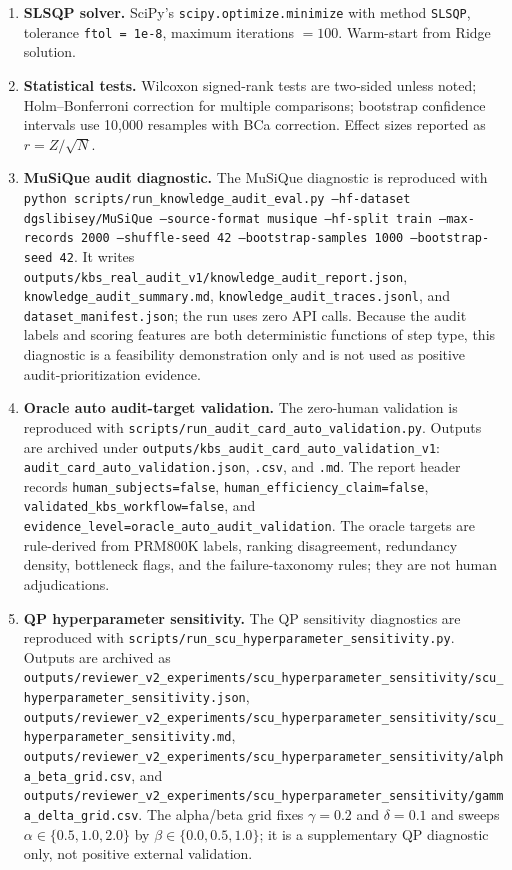 \documentclass[a4paper,fleqn]{cas-sc}
\begin{document}
\begin{enumerate}
\item \textbf{SLSQP solver.} SciPy's \texttt{scipy.optimize.minimize} with method \texttt{SLSQP}, tolerance \texttt{ftol = 1e-8}, maximum iterations $= 100$. Warm-start from Ridge solution.
\item \textbf{Statistical tests.} Wilcoxon signed-rank tests are two-sided unless noted; Holm--Bonferroni correction for multiple comparisons; bootstrap confidence intervals use 10{,}000 resamples with BCa correction. Effect sizes reported as $r = Z/\sqrt{N}$.
\item \textbf{MuSiQue audit diagnostic.} The MuSiQue diagnostic is reproduced with \texttt{python scripts/run\_knowledge\_audit\_eval.py --hf-dataset dgslibisey/MuSiQue --source-format musique --hf-split train --max-records 2000 --shuffle-seed 42 --bootstrap-samples 1000 --bootstrap-seed 42}. It writes \texttt{outputs/kbs\_real\_audit\_v1/knowledge\_audit\_report.json}, \texttt{knowledge\_audit\_summary.md}, \texttt{knowledge\_audit\_traces.jsonl}, and \texttt{dataset\_manifest.json}; the run uses zero API calls. Because the audit labels and scoring features are both deterministic functions of step type, this diagnostic is a feasibility demonstration only and is not used as positive audit-prioritization evidence.
\item \textbf{Oracle auto audit-target validation.} The zero-human validation is reproduced with \texttt{scripts/run\_audit\_card\_auto\_validation.py}. Outputs are archived under \texttt{outputs/kbs\_audit\_card\_auto\_validation\_v1}: \texttt{audit\_card\_auto\_validation.json}, \texttt{.csv}, and \texttt{.md}. The report header records \texttt{human\_subjects=false}, \texttt{human\_efficiency\_claim=false}, \texttt{validated\_kbs\_workflow=false}, and \texttt{evidence\_level=oracle\_auto\_audit\_validation}. The oracle targets are rule-derived from PRM800K labels, ranking disagreement, redundancy density, bottleneck flags, and the failure-taxonomy rules; they are not human adjudications.
\item \textbf{QP hyperparameter sensitivity.} The QP sensitivity diagnostics are reproduced with \texttt{scripts/run\_scu\_hyperparameter\_sensitivity.py}. Outputs are archived as \texttt{outputs/reviewer\_v2\_experiments/scu\_hyperparameter\_sensitivity/scu\_hyperparameter\_sensitivity.json}, \texttt{outputs/reviewer\_v2\_experiments/scu\_hyperparameter\_sensitivity/scu\_hyperparameter\_sensitivity.md}, \texttt{outputs/reviewer\_v2\_experiments/scu\_hyperparameter\_sensitivity/alpha\_beta\_grid.csv}, and \texttt{outputs/reviewer\_v2\_experiments/scu\_hyperparameter\_sensitivity/gamma\_delta\_grid.csv}. The alpha/beta grid fixes $\gamma=0.2$ and $\delta=0.1$ and sweeps $\alpha \in \{0.5,1.0,2.0\}$ by $\beta \in \{0.0,0.5,1.0\}$; it is a supplementary QP diagnostic only, not positive external validation.

\end{enumerate}
\end{document}
